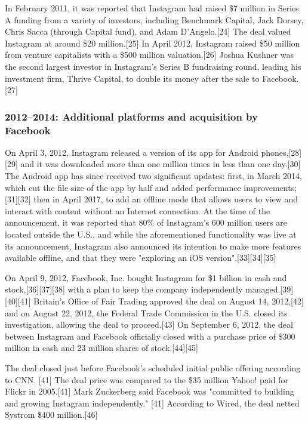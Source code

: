 \documentclass[12pt]{article}
\begin{document}
In February 2011, it was reported that Instagram had raised \$7 million in Series A funding from a variety of investors, including Benchmark Capital, Jack Dorsey, Chris Sacca (through Capital fund), and Adam D'Angelo.[24] The deal valued Instagram at around \$20 million.[25] In April 2012, Instagram raised \$50 million from venture capitalists with a \$500 million valuation.[26] Joshua Kushner was the second largest investor in Instagram's Series B fundraising round, leading his investment firm, Thrive Capital, to double its money after the sale to Facebook.[27] 




\subsubsection{2012–2014: Additional platforms and acquisition by Facebook}



On April 3, 2012, Instagram released a version of its app for Android phones,[28][29] and it was downloaded more than one million times in less than one day.[30] The Android app has since received two significant updates: first, in March 2014, which cut the file size of the app by half and added performance improvements;[31][32] then in April 2017, to add an offline mode that allows users to view and interact with content without an Internet connection. At the time of the announcement, it was reported that 80\% of Instagram's 600 million users are located outside the U.S., and while the aforementioned functionality was live at its announcement, Instagram also announced its intention to make more features available offline, and that they were "exploring an iOS version".[33][34][35]

On April 9, 2012, Facebook, Inc. bought Instagram for \$1 billion in cash and stock,[36][37][38] with a plan to keep the company independently managed.[39][40][41] Britain's Office of Fair Trading approved the deal on August 14, 2012,[42] and on August 22, 2012, the Federal Trade Commission in the U.S. closed its investigation, allowing the deal to proceed.[43] On September 6, 2012, the deal between Instagram and Facebook officially closed with a purchase price of \$300 million in cash and 23 million shares of stock.[44][45]

The deal closed just before Facebook's scheduled initial public offering according to CNN. [41] The deal price was compared to the \$35 million Yahoo! paid for Flickr in 2005.[41] Mark Zuckerberg said Facebook was "committed to building and growing Instagram independently." [41] According to Wired, the deal netted Systrom \$400 million.[46]
\end{document}

